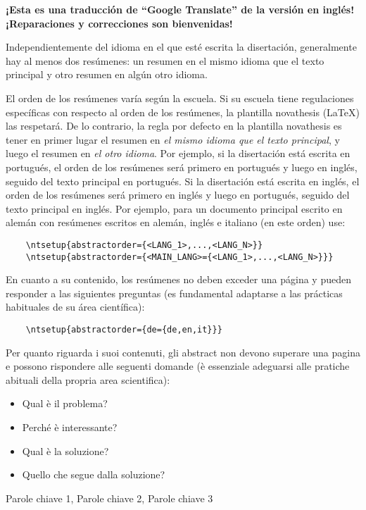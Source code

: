 
%


\textbf{¡Esta es una traducción de “Google Translate” de la versión en inglés! ¡Reparaciones y correcciones son bienvenidas!}

Independientemente del idioma en el que esté escrita la disertación, generalmente hay al menos dos resúmenes: un resumen en el mismo idioma que el texto principal y otro resumen en algún otro idioma.

El orden de los resúmenes varía según la escuela. Si su escuela tiene regulaciones específicas con respecto al orden de los resúmenes, la plantilla \gls{novathesis} (\LaTeX) las respetará. De lo contrario, la regla por defecto en la plantilla \gls{novathesis} es tener en primer lugar el resumen en \emph{el mismo idioma que el texto principal}, y luego el resumen en \emph{el otro idioma}. Por ejemplo, si la disertación está escrita en portugués, el orden de los resúmenes será primero en portugués y luego en inglés, seguido del texto principal en portugués. Si la disertación está escrita en inglés, el orden de los resúmenes será primero en inglés y luego en portugués, seguido del texto principal en inglés.
%
Por ejemplo, para un documento principal escrito en alemán con resúmenes escritos en alemán, inglés e italiano (en este orden) use:

\begin{verbatim}
    \ntsetup{abstractorder={<LANG_1>,...,<LANG_N>}}
    \ntsetup{abstractorder={<MAIN_LANG>={<LANG_1>,...,<LANG_N>}}}
\end{verbatim}

En cuanto a su contenido, los resúmenes no deben exceder una página y pueden responder a las siguientes preguntas (es fundamental adaptarse a las prácticas habituales de su área científica):
\begin{verbatim}
    \ntsetup{abstractorder={de={de,en,it}}}
\end{verbatim}

Per quanto riguarda i suoi contenuti, gli abstract non devono superare una pagina e possono rispondere alle seguenti domande (è essenziale adeguarsi alle pratiche abituali della propria area scientifica):

\begin{itemize}
\item Qual è il problema?
\item Perché è interessante?
\item Qual è la soluzione?
\item Quello che segue dalla soluzione?
\end{itemize}

\begin{keywords}
Parole chiave 1, Parole chiave 2, Parole chiave 3
\end{keywords}
